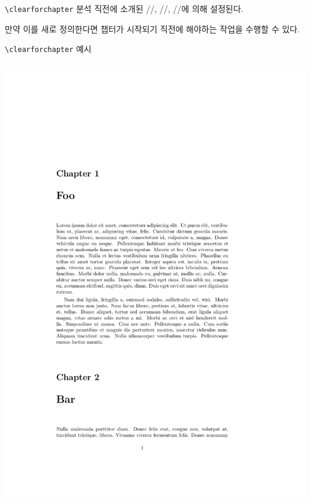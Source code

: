 \documentclass{beamer}
\def\tbs{\textbackslash}
\begin{document}
\begin{frame}[fragile]{\texttt{\tbs clearforchapter} 분석}
  직전에 소개된 \ltxverb/\openright/, \ltxverb/\openleft/, \ltxverb/\openany/에
  의해 설정된다.

  만약 이를 새로 정의한다면 챕터가 시작되기 직전에 해야하는 작업을 수행할 수
  있다.
\end{frame}

\begin{frame}[fragile]{\texttt{\tbs clearforchapter} 예시}
  \begin{latexcode}
    \renewcommand*{\clearforchapter}{}
  \end{latexcode}

  \begin{columns}
    \begin{column}{0.4\textwidth}
      \includegraphics[frame,page=1,width=\linewidth]{examples/clearforchapter}

\end{column}
\end{columns}
\end{frame}
\end{document}
